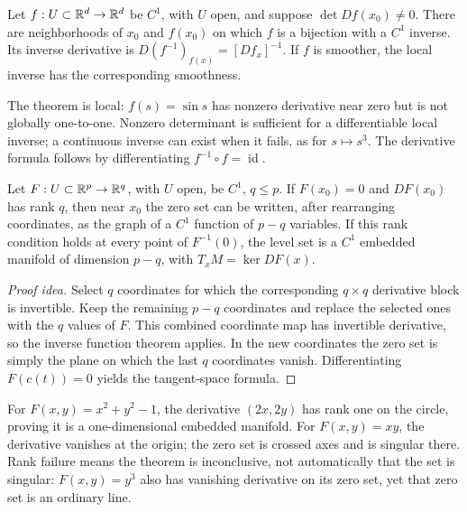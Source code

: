 \begin{theorem}\label{thm:inverse-function}
Let $f:U\subset\mathbb{R}^d\to\mathbb{R}^d$ be $C^1$, with $U$ open, and suppose $\det Df(x_0)\ne0$. There are neighborhoods of $x_0$ and $f(x_0)$ on which $f$ is a bijection with a $C^1$ inverse. Its inverse derivative is $D(f^{-1})_{f(x)}=[Df_x]^{-1}$. If $f$ is smoother, the local inverse has the corresponding smoothness.
\end{theorem}
The theorem is local: $f(s)=\sin s$ has nonzero derivative near zero but is not globally one-to-one. Nonzero determinant is sufficient for a differentiable local inverse; a continuous inverse can exist when it fails, as for $s\mapsto s^3$. The derivative formula follows by differentiating $f^{-1}\circ f=\operatorname{id}$.

\begin{theorem}\label{thm:implicit-function}
Let $F:U\subset\mathbb{R}^p\to\mathbb{R}^q$, with $U$ open, be $C^1$, $q\leq p$. If $F(x_0)=0$ and $DF(x_0)$ has rank $q$, then near $x_0$ the zero set can be written, after rearranging coordinates, as the graph of a $C^1$ function of $p-q$ variables. If this rank condition holds at every point of $F^{-1}(0)$, the level set is a $C^1$ embedded manifold of dimension $p-q$, with $T_xM=\ker DF(x)$.
\end{theorem}
\begin{proof}[Proof idea]
Select $q$ coordinates for which the corresponding $q\times q$ derivative block is invertible. Keep the remaining $p-q$ coordinates and replace the selected ones with the $q$ values of $F$. This combined coordinate map has invertible derivative, so the inverse function theorem applies. In the new coordinates the zero set is simply the plane on which the last $q$ coordinates vanish. Differentiating $F(c(t))=0$ yields the tangent-space formula.
\end{proof}
For $F(x,y)=x^2+y^2-1$, the derivative $(2x,2y)$ has rank one on the circle, proving it is a one-dimensional embedded manifold. For $F(x,y)=xy$, the derivative vanishes at the origin; the zero set is crossed axes and is singular there. Rank failure means the theorem is inconclusive, not automatically that the set is singular: $F(x,y)=y^3$ also has vanishing derivative on its zero set, yet that zero set is an ordinary line.

